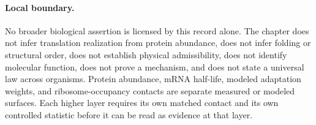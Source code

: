 \paragraph{Local boundary.}
No broader biological assertion is licensed by this record alone.  The chapter does not infer translation realization from protein abundance, does not infer folding or structural order, does not establish physical admissibility, does not identify molecular function, does not prove a mechanism, and does not state a universal law across organisms.  Protein abundance, mRNA half-life, modeled adaptation weights, and ribosome-occupancy contacts are separate measured or modeled surfaces.  Each higher layer requires its own matched contact and its own controlled statistic before it can be read as evidence at that layer.
